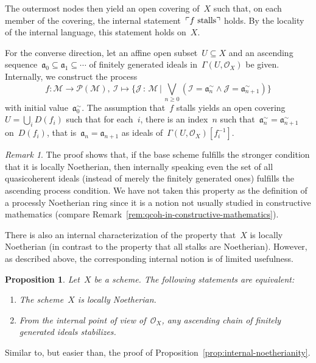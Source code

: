 \documentclass[10pt,reqno,a4paper]{amsbook}
\makeatletter
\theoremstyle{definition}
\theoremstyle{plain}
\newtheorem{prop}[defn]{Proposition}
\theoremstyle{remark}
\newtheorem{rem}[defn]{Remark}
\renewcommand{\O}{\mathcal{O}}
\newcommand{\M}{\mathcal{M}}
\renewcommand{\P}{\mathcal{P}}
\newcommand{\I}{\mathcal{I}}
\newcommand{\J}{\mathcal{J}}
\newcommand{\aaa}{\mathfrak{a}}
\newcommand{\?}{\,{:}\,}
\renewcommand{\_}{\mathpunct{.}\,}
\newcommand{\speak}[1]{\ulcorner\text{\textnormal{#1}}\urcorner}
\newcommand{\lra}{\longrightarrow}
\renewenvironment{proof}[1][\proofname]{\par
  \pushQED{\qed}%
  \normalfont \topsep6\p@\@plus6\p@\relax
  \trivlist
  \item[\hskip\labelsep
        \itshape
    #1\@addpunct{.}]\ignorespaces
}{%
  \popQED\endtrivlist\@endpefalse
}
\makeatother
\begin{document}
{\begin{proof}
The outermost nodes then yield an open covering of~$X$ such that, on each
member of the covering, the internal statement~$\speak{$f$ stalls}$ holds. By
the locality of the internal language, this statement holds on~$X$.

For the converse direction, let an affine open subset~$U \subseteq X$ and an
ascending sequence~$\aaa_0 \subseteq \aaa_1 \subseteq \cdots$ of finitely
generated ideals in~$\Gamma(U, \O_X)$ be given. Internally, we construct the
process
\[ f : \M \lra \P(\M),\ \I \longmapsto \{ \J \? \M \,|\,
  \bigvee_{n \geq 0} (\I = \aaa_n^\sim \wedge \J = \aaa_{n+1}^\sim) \} \]
with initial value~$\aaa_0^\sim$. The assumption that~$f$ stalls yields an open
covering~$U = \bigcup_i D(f_i)$ such that for each~$i$, there is an index~$n$
such that~$\aaa_n^\sim = \aaa_{n+1}^\sim$ on~$D(f_i)$, that is~$\aaa_n =
\aaa_{n+1}$ as ideals of~$\Gamma(U, \O_X)[f_i^{-1}]$.
\end{proof}

\begin{rem}The proof shows that, if the base scheme fulfills the stronger
condition that it is locally Noetherian, then internally speaking even the set
of all quasicoherent ideals (instead of merely the finitely generated
ones) fulfills the ascending process condition. We have not taken this property
as the definition of a processly Noetherian ring since it is a notion not
usually studied in constructive mathematics (compare
Remark~\ref{rem:qcoh-in-constructive-mathematics}).
\end{rem}

There is also an internal characterization of the property that~$X$ is locally
Noetherian (in contrast to the property that all stalks are Noetherian).
However, as described above, the corresponding internal notion is of limited
usefulness.

\begin{prop}Let~$X$ be a scheme. The following statements are equivalent:
\begin{enumerate}
\item The scheme~$X$ is locally Noetherian.
\item From the internal point of view of~$\O_X$, any ascending chain of
finitely generated ideals stabilizes.
\end{enumerate}
\end{prop}

\begin{proof}Similar to, but easier than, the proof of
Proposition~\ref{prop:internal-noetherianity}.
\end{proof}

}
\end{document}
